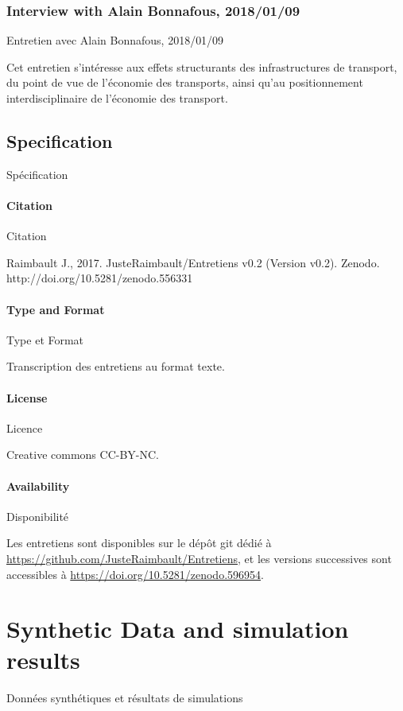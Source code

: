 \subsubsection{Interview with Alain Bonnafous, 2018/01/09}{Entretien avec Alain Bonnafous, 2018/01/09}

Cet entretien s'intéresse aux effets structurants des infrastructures de transport, du point de vue de l'économie des transports, ainsi qu'au positionnement interdisciplinaire de l'économie des transport.



\subsection{Specification}{Spécification}

\paragraph{Citation}{Citation}

Raimbault J., 2017. JusteRaimbault/Entretiens v0.2 (Version v0.2). Zenodo. http://doi.org/10.5281/zenodo.556331

\paragraph{Type and Format}{Type et Format}

Transcription des entretiens au format texte.

\paragraph{License}{Licence}

Creative commons CC-BY-NC.

\paragraph{Availability}{Disponibilité}

Les entretiens sont disponibles sur le dépôt git dédié à \url{https://github.com/JusteRaimbault/Entretiens}, et les versions successives sont accessibles à \url{https://doi.org/10.5281/zenodo.596954}.








\section{Synthetic Data and simulation results}{Données synthétiques et résultats de simulations}

